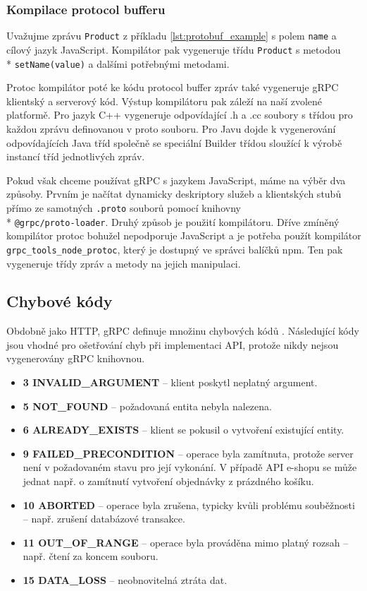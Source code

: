 \documentclass[thesis=M,czech]{FITthesis}[2019/12/23]
\begin{document}
\subsubsection*{Kompilace protocol bufferu}
Uvažujme zprávu \texttt{Product} z příkladu \ref{lst:protobuf_example} s polem  \texttt{name} a cílový jazyk JavaScript. Kompilátor pak vygeneruje třídu \texttt{Product} s metodou \\* \texttt{setName(value)} a dalšími potřebnými metodami.

Protoc kompilátor poté ke kódu protocol buffer zpráv také vygeneruje gRPC klientský a serverový kód. Výstup kompilátoru pak záleží na naší zvolené platformě. Pro jazyk C++ vygeneruje odpovídající .h a .cc soubory s třídou pro každou zprávu definovanou v proto souboru. Pro Javu dojde k vygenerování odpovídajících Java tříd společně se speciální Builder třídou sloužící k výrobě instancí tříd jednotlivých zpráv.

Pokud však chceme používat gRPC s jazykem JavaScript, máme na výběr dva způsoby. Prvním je načítat dynamicky deskriptory služeb a klientských stubů přímo ze samotných \texttt{.proto} souborů pomocí knihovny \\* \texttt{@grpc/proto-loader}.
Druhý způsob je použití kompilátoru. Dříve zmíněný kompilátor protoc bohužel nepodporuje JavaScript a je potřeba použít kompilátor \texttt{grpc_tools_node_protoc}, který je dostupný ve správci balíčků npm. Ten pak vygeneruje třídy zpráv a metody na jejich manipulaci.

\subsection{Chybové kódy}
Obdobně jako HTTP, gRPC definuje množinu chybových kódů \cite{grpc_codes}. Následující kódy jsou vhodné pro ošetřování chyb při implementaci API, protože nikdy nejsou vygenerovány gRPC knihovnou.

\begin{itemize}
  \item \textbf{3 INVALID\_ARGUMENT} -- klient poskytl neplatný argument.
  \item \textbf{5 NOT\_FOUND} -- požadovaná entita nebyla nalezena.
  \item \textbf{6 ALREADY\_EXISTS} -- klient se pokusil o vytvoření existující entity.
  \item \textbf{9 FAILED\_PRECONDITION} -- operace byla zamítnuta, protože server není v požadovaném stavu pro její vykonání. V případě API e-shopu se může jednat např. o zamítnutí vytvoření objednávky z prázdného košíku.
  \item \textbf{10 ABORTED} -- operace byla zrušena, typicky kvůli problému souběžnosti -- např. zrušení databázové transakce.
  \item \textbf{11 OUT\_OF\_RANGE} -- operace byla prováděna mimo platný rozsah -- např. čtení za koncem souboru.
  \item \textbf{15 DATA\_LOSS} -- neobnovitelná ztráta dat.
\end{itemize}
\end{document}
